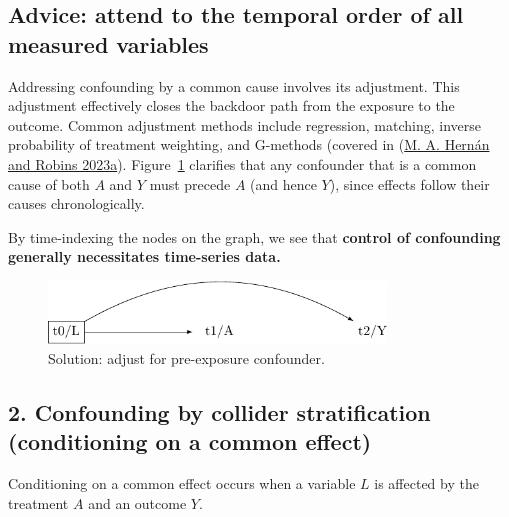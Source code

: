 \documentclass[
  singlecolumn]{report}
\begin{document}
\hypertarget{advice-attend-to-the-temporal-order-of-all-measured-variables}{%
\subsection{Advice: attend to the temporal order of all measured
variables}\label{advice-attend-to-the-temporal-order-of-all-measured-variables}}

Addressing confounding by a common cause involves its adjustment. This
adjustment effectively closes the backdoor path from the exposure to the
outcome. Common adjustment methods include regression, matching, inverse
probability of treatment weighting, and G-methods (covered in
(\protect\hyperlink{ref-hernuxe1n2023a}{M. A. Hernán and Robins 2023a}).
Figure~\ref{fig-dag-common-cause-solution} clarifies that any confounder
that is a common cause of both \(A\) and \(Y\) must precede \(A\) (and
hence \(Y\)), since effects follow their causes chronologically.

By time-indexing the nodes on the graph, we see that \textbf{control of
confounding generally necessitates time-series data.}

\begin{figure}

{\centering \includegraphics[width=0.8\textwidth,height=\textheight]{causal-dags_files/figure-pdf/fig-dag-common-cause-solution-1.pdf}

}

\caption{\label{fig-dag-common-cause-solution}Solution: adjust for
pre-exposure confounder.}

\end{figure}

\hypertarget{confounding-by-collider-stratification-conditioning-on-a-common-effect}{%
\subsection{2. Confounding by collider stratification (conditioning on a
common
effect)}\label{confounding-by-collider-stratification-conditioning-on-a-common-effect}}

Conditioning on a common effect occurs when a variable \(L\) is affected
by the treatment \(A\) and an outcome \(Y\).
\end{document}
